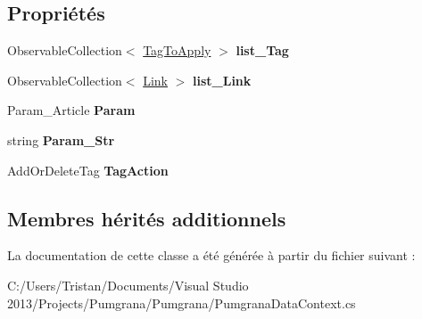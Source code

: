 \subsection*{Propriétés}
\begin{DoxyCompactItemize}
\item 
\hypertarget{class_pumgrana_1_1_d_t___edit_content_a68fe758b6354f4b72204dc41049670f2}{Observable\+Collection$<$ \hyperlink{class_pumgrana_1_1_tag_to_apply}{Tag\+To\+Apply} $>$ {\bfseries list\+\_\+\+Tag}}\label{class_pumgrana_1_1_d_t___edit_content_a68fe758b6354f4b72204dc41049670f2}

\item 
\hypertarget{class_pumgrana_1_1_d_t___edit_content_adf3e1de2b76c83323b160cfcd76a2d81}{Observable\+Collection$<$ \hyperlink{class_pumgrana_1_1_link}{Link} $>$ {\bfseries list\+\_\+\+Link}}\label{class_pumgrana_1_1_d_t___edit_content_adf3e1de2b76c83323b160cfcd76a2d81}

\item 
\hypertarget{class_pumgrana_1_1_d_t___edit_content_a2022f458abf933f9b4a5d5bb8443bd26}{Param\+\_\+\+Article {\bfseries Param}}\label{class_pumgrana_1_1_d_t___edit_content_a2022f458abf933f9b4a5d5bb8443bd26}

\item 
\hypertarget{class_pumgrana_1_1_d_t___edit_content_a59c09e3d407eb9ba4cc7acf8d23c97f7}{string {\bfseries Param\+\_\+\+Str}}\label{class_pumgrana_1_1_d_t___edit_content_a59c09e3d407eb9ba4cc7acf8d23c97f7}

\item 
\hypertarget{class_pumgrana_1_1_d_t___edit_content_a51f545505fe349136d9a7d39b2e5b57f}{Add\+Or\+Delete\+Tag {\bfseries Tag\+Action}}\label{class_pumgrana_1_1_d_t___edit_content_a51f545505fe349136d9a7d39b2e5b57f}

\end{DoxyCompactItemize}
\subsection*{Membres hérités additionnels}


La documentation de cette classe a été générée à partir du fichier suivant \+:\begin{DoxyCompactItemize}
\item 
C\+:/\+Users/\+Tristan/\+Documents/\+Visual Studio 2013/\+Projects/\+Pumgrana/\+Pumgrana/Pumgrana\+Data\+Context.\+cs\end{DoxyCompactItemize}
